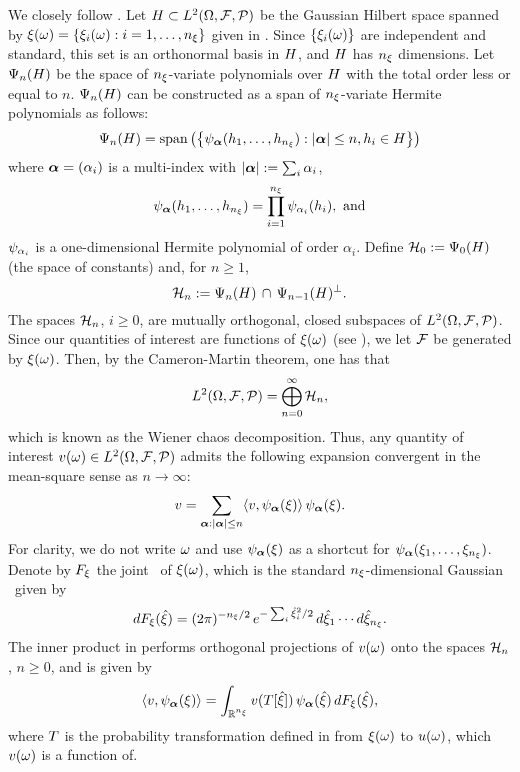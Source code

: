 We closely follow \cite{janson1997}.
Let $H \subset L^{2}(\Omega, \mathcal{F}, \mathcal{P})$ be the Gaussian Hilbert space spanned by $\xi(\omega) = \{ \xi_i(\omega): i = 1, \dots, {n_\xi} \}$ given in .
Since $\{ \xi_i(\omega) \}$ are independent and standard, this set is an orthonormal basis in $H$, and $H$ has ${n_\xi}$ dimensions.
Let $\Psi_n(H)$ be the space of ${n_\xi}$-variate polynomials over $H$ with the total order less or equal to $n$.
$\Psi_n(H)$ can be constructed as a span of ${n_\xi}$-variate Hermite polynomials as follows:
\[
  \Psi_{n}(H) = \text{span}\left( \left\{ \psi_{\boldsymbol\alpha}(h_1, \dots, h_{n_\xi}): |{\boldsymbol\alpha}| \leq n, h_i \in H \right\} \right)
\]
where ${\boldsymbol\alpha} = (\alpha_i)$ is a multi-index with $|{\boldsymbol\alpha}| := \sum_i \alpha_i$,
\[
  \psi_{\boldsymbol\alpha}(h_1, \dots, h_{n_\xi}) = \prod_{i = 1}^{n_\xi} \psi_{\alpha_i}(h_i), \text{ and}
\]
$\psi_{\alpha_i}$ is a one-dimensional Hermite polynomial of order $\alpha_i$.
Define $\mathcal{H}_0 := \Psi_0(H)$ (the space of constants) and, for $n \geq 1$,
\[
  \mathcal{H}_n := \Psi_n(H) \, \cap \, \Psi_{n - 1}(H)^\perp.
\]
The spaces $\mathcal{H}_n$, $i \geq 0$, are mutually orthogonal, closed subspaces of $L^{2}(\Omega, \mathcal{F}, \mathcal{P})$.
Since our quantities of interest are functions of $\xi(\omega)$ (see ), we let $\mathcal{F}$ be generated by $\xi(\omega)$.
Then, by the Cameron-Martin theorem, one has that
\[
  L^{2}(\Omega, \mathcal{F}, \mathcal{P}) = \bigoplus_{n = 0}^\infty \mathcal{H}_n,
\]
which is known as the Wiener chaos decomposition.
Thus, any quantity of interest $v(\omega) \in L^{2}(\Omega, \mathcal{F}, \mathcal{P})$ admits the following expansion convergent in the mean-square sense as $n \to \infty$:
\begin{equation} \elab{wiener-chaos-decomposition}
  \w = \sum_{\multiindex: |\multiindex| \leq n} \oInnerProduct{\w, \polynomial_\multiindex(\z)} \, \polynomial_\multiindex(\z).
\end{equation}
For clarity, we do not write $\omega$ and use $\psi_{\boldsymbol\alpha}(\xi)$ as a shortcut for $\psi_{\boldsymbol\alpha}(\xi_1, \dots, \xi_{n_\xi})$.
Denote by $F_\xi$ the joint \cdf\ of $\xi(\omega)$, which is the standard ${n_\xi}$-dimensional Gaussian \cdf\ given by
\[
  dF_\xi(\hat{\xi}) = (2 \pi)^{-{n_\xi}/2} \, e^{-\sum_i \hat{\xi}_i^2 / 2} \, d\hat{\xi}_1 \cdots d\hat{\xi}_{n_\xi}.
\]
The inner product in  performs orthogonal projections of $v(\omega)$ onto the spaces $\mathcal{H}_n$, $n \geq 0$, and is given by
\[
  \oInnerProduct{\w, \polynomial_\multiindex(\z)} = \int_{\real^{\nvars}} \w(\oTransform[\hat{\z}]) \, \polynomial_\multiindex(\hat{\z}) \, \d\fCDF_\z(\hat{\z}),
\]
where $\oTransform$ is the probability transformation defined in  from $\xi(\omega)$ to $u(\omega)$, which $v(\omega)$ is a function of.
